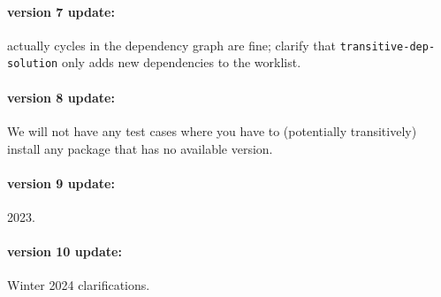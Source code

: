 \documentclass[12pt]{article}
\renewcommand{\_}{\kern-1.5pt\textunderscore\kern-1.5pt}
\begin{document}
\paragraph{version 7 update:} actually cycles in the dependency graph are fine; clarify that \texttt{transitive-dep-solution} only adds new dependencies to the worklist.

\paragraph{version 8 update:} We will not have any test cases where you have to (potentially transitively) install any package that has no available version.

\paragraph{version 9 update:} 2023.

\paragraph{version 10 update:} Winter 2024 clarifications.
\end{document}

